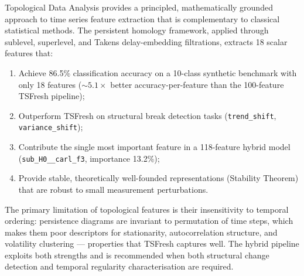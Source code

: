 \documentclass[12pt, a4paper]{article}
\theoremstyle{definition}
\theoremstyle{plain}
\begin{document}
Topological Data Analysis provides a principled, mathematically grounded approach
to time series feature extraction that is complementary to classical statistical
methods. The persistent homology framework, applied through sublevel, superlevel,
and Takens delay-embedding filtrations, extracts 18 scalar features that:

\begin{enumerate}
  \item Achieve 86.5\% classification accuracy on a 10-class synthetic benchmark
    with only 18 features ($\sim 5.1\times$ better accuracy-per-feature than the
    100-feature TSFresh pipeline);
  \item Outperform TSFresh on structural break detection tasks (\texttt{trend\_shift},
    \texttt{variance\_shift});
  \item Contribute the single most important feature in a 118-feature hybrid model
    (\texttt{sub\_H0\_\_carl\_f3}, importance 13.2\%);
  \item Provide stable, theoretically well-founded representations (Stability Theorem)
    that are robust to small measurement perturbations.
\end{enumerate}

The primary limitation of topological features is their insensitivity to temporal
ordering: persistence diagrams are invariant to permutation of time steps, which
makes them poor descriptors for stationarity, autocorrelation structure, and
volatility clustering — properties that TSFresh captures well. The hybrid pipeline
exploits both strengths and is recommended when both structural change detection
and temporal regularity characterisation are required.

\newpage
\printbibliography
\end{document}
